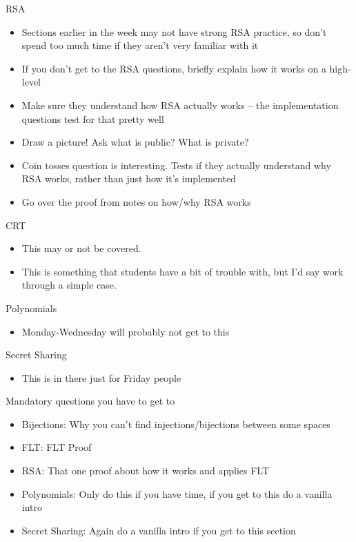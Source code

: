 \documentclass{exam}
\begin{document}
\begin{questions}
\item RSA
\begin{itemize}
\item Sections earlier in the week may not have strong RSA practice, so don’t spend too much time if they aren’t very familiar with it
\item If you don’t get to the RSA questions, briefly explain how it works on a high-level
\item Make sure they understand how RSA actually works – the implementation questions test for that pretty well
\item Draw a picture! Ask what is public? What is private?
\item Coin tosses question is interesting. Tests if they actually understand why RSA works, rather than just how it’s implemented
\item Go over the proof from notes on how/why RSA works
\end{itemize}

\item CRT
\begin{itemize}
\item This may or not be covered. 
\item This is something that students have a bit of trouble with, but I'd say work through a simple case. 
\end{itemize}

\item Polynomials
\begin{itemize}
\item Monday-Wednesday will probably not get to this
\end{itemize}

\item Secret Sharing
\begin{itemize}
\item This is in there just for Friday people
\end{itemize}
\item Mandatory questions you have to get to
\begin{itemize}
\item Bijections:  Why you can’t find injections/bijections between some spaces
\item FLT: FLT Proof
\item RSA: That one proof about how it works and applies FLT
\item Polynomials: Only do this if you have time, if you get to this do a vanilla intro
\item Secret Sharing: Again do a vanilla intro if you get to this section
\end{itemize}

\end{questions}
\end{document}
